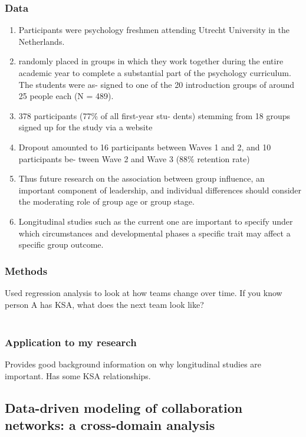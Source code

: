 \documentclass[12pt]{article}
\begin{document}
\subsubsection*{Data}
\begin{enumerate}
    \item Participants were psychology freshmen attending Utrecht University in the Netherlands.
    \item randomly placed in groups in which they work together during the entire academic year to complete a substantial part of the psychology curriculum. The students were as- signed to one of the 20 introduction groups of around 25 people each (N = 489).
    \item 378 participants (77\% of all first-year stu- dents) stemming from 18 groups signed up for the study via a website
    \item Dropout amounted to 16 participants between Waves 1 and 2, and 10 participants be- tween Wave 2 and Wave 3 (88\% retention rate)
    \item Thus future research on the association between group influence, an important component of leadership, and individual differences should consider the moderating role of group age or group stage.
    \item Longitudinal studies such as the current one are important to specify under which circumstances and developmental phases a specific trait may affect a specific group outcome.
\end{enumerate}

\subsubsection*{Methods}

Used regression analysis to look at how teams change over time. If you know person A has KSA, what does the next team look like?\\\\



\subsubsection*{Application to my research}

Provides good background information on why longitudinal studies are important. Has some KSA relationships.


\subsection*{Data-driven modeling of collaboration networks: a cross-domain analysis\cite{data_driven_modeling}}
\end{document}
